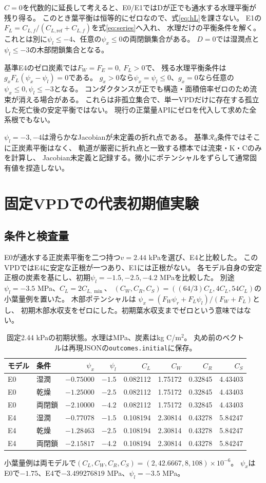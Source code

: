 \documentclass[a4paper,11pt]{ltjsarticle}
\newcommand{\code}[1]{\nolinkurl{#1}}
\begin{document}
$C=0$を代数的に延長して考えると、E0/E1ではDが正でも通水する水理平衡が残り得る。
このとき葉平衡は恒等的にゼロなので、式\eqref{eq:hL}を課さない。
E1の$F_L=C_{L,f}/(C_{L,\mathrm{ref}}+C_{L,f})$を式\eqref{eq:series}へ入れ、
水理だけの平衡条件を解く。これとは別に$\psi_l\le-4$、任意の$\psi_x\le0$の両閉鎖集合がある。
$D=0$では湿潤点と$\psi_l\le-3$の木部閉鎖集合となる。

基準E4のゼロ炭素では$F_W=F_E=0,\ F_L>0$で、
残る水理平衡条件は$g_xF_L(\psi_x-\psi_l)=0$である。
$g_x>0$なら$\psi_x=\psi_l\le0$、$g_x=0$なら任意の$\psi_x\le0,\psi_l\le-3$となる。
コンダクタンスが正でも構造・面積倍率ゼロのため流束が消える場合がある。
これらは非孤立集合で、単一VPDだけに存在する孤立した死亡後の安定平衡ではない。
現行の正葉量APIにゼロを代入して求めた全系根でもない。

$\psi_l=-3,-4$は滑らかなJacobianが未定義の折れ点である。
基準$\mathcal R_0$条件ではそこに正炭素平衡はなく、
軌道が厳密に折れ点と一致する標本では流束・K・Cのみを計算し、
Jacobian未定義と記録する。微小にポテンシャルをずらして通常固有値を捏造しない。

\section{固定VPDでの代表初期値実験}\label{sec:fixed}
\subsection{条件と検査量}
E0が通水する正炭素平衡を二つ持つ$v=2.44$ kPaを選び、E4と比較した。
このVPDではE4に安定な正根が一つあり、E1には正根がない。
各モデル自身の安定正根の炭素を基にし、初期$\psi_l=-1.5,-2.5,-4.2$ MPaを比較した。
別途$\psi_l=-3.5$ MPa、$C_L=2C_{L,\min}$、
$(C_W,C_R,C_S)=((64/3)C_L,4C_L,54C_L)$の小葉量例を置いた。
木部ポテンシャルは
$\psi_x=(F_W\psi_r+F_L\psi_l)/(F_W+F_L)$とし、
初期木部水収支をゼロにした。初期葉水収支までゼロという意味ではない。

\begin{table}[htbp]
\centering
\small
\caption{固定2.44 kPaの初期状態。水理はMPa、炭素はkg C/m$^2$。
丸め前のベクトルは再現JSONの\code{outcomes.initial}に保存。}\label{tab:initial}
\begin{tabular}{llrrrrrr}
\toprule
モデル&条件&$\psi_x$&$\psi_l$&$C_L$&$C_W$&$C_R$&$C_S$\\\midrule
E0&湿潤&$-0.75000$&$-1.5$&0.082112&1.75172&0.32845&4.43403\\
E0&乾燥&$-1.25000$&$-2.5$&0.082112&1.75172&0.32845&4.43403\\
E0&両閉鎖&$-2.10000$&$-4.2$&0.082112&1.75172&0.32845&4.43403\\
E4&湿潤&$-0.77078$&$-1.5$&0.108194&2.30814&0.43278&5.84247\\
E4&乾燥&$-1.28463$&$-2.5$&0.108194&2.30814&0.43278&5.84247\\
E4&両閉鎖&$-2.15817$&$-4.2$&0.108194&2.30814&0.43278&5.84247\\
\bottomrule
\end{tabular}
\par\smallskip
小葉量例は両モデルで$(C_L,C_W,C_R,C_S)=(2,42.6667,8,108)\times10^{-6}$。
$\psi_x$はE0で$-1.75$、E4で$-3.499276819$ MPa、$\psi_l=-3.5$ MPa。
\end{table}
\end{document}
